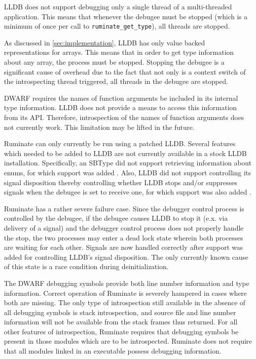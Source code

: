 \documentclass{report}
\begin{document}
LLDB does not support debugging only a single thread of a multi-threaded
application. This means that whenever the debugee must be stopped (which is a
minimum of once per call to \lstinline|ruminate_get_type|), all threads are
stopped.

As discussed in \cref{sec:implementation}, LLDB has only value backed
representations for arrays. This means that in order to get type information
about any array, the process must be stopped. Stopping the debugee is a
significant cause of overhead due to the fact that not only is a context switch
of the introspecting thread triggered, all threads in the debugee are stopped.

DWARF requires the names of function arguments be included in its internal type
information. LLDB does not provide a means to access this information from its
API. Therefore, introspection of the names of function arguments does not
currently work. This limitation may be lifted in the future.

Ruminate can only currently be run using a patched LLDB. Several features which
needed to be added to LLDB are not currently available in a stock LLDB
installation. Specifically, an SBType did not support retrieving information
about enums, for which support was added \autocite{lldb-enums}. Also, LLDB did
not support controlling its signal disposition thereby controlling whether LLDB
stops and/or suppresses signals when the debugee is set to receive one, for
which support was also added \autocite{lldb-signals}.

Ruminate has a rather severe failure case. Since the debugger control process is
controlled by the debugee, if the debugee causes LLDB to stop it (e.x. via
delivery of a signal) and the debugger control process does not properly handle
the stop, the two processes may enter a dead lock state wherein both processes
are waiting for each other. Signals are now handled correctly after support was
added for controlling LLDB's signal disposition. The only currently known cause
of this state is a race condition during deinitialization.

The DWARF debugging symbols provide both line number information and
type information. Correct operation of Ruminate is severely hampered in cases
where both are missing. The only type of introspection still available in the
absence of all debugging symbols is stack introspection, and source file and
line number information will not be available from the stack frames thus
returned.  For all other features of introspection, Ruminate requires that
debugging symbols be present in those modules which are to be introspected.
Ruminate does not require that all modules linked in an executable possess
debugging information.
\end{document}
